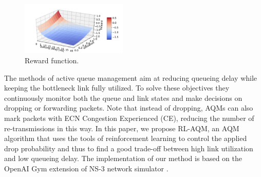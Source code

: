 \documentclass[conference]{IEEEtran}
\begin{document}
\begin{figure}[ht]
\begin{center}
\includegraphics[width=0.45\textwidth]{Figures/reward.pdf}
\end{center}
\caption{Reward function.}
\label{fig:reward}
\end{figure}


The methods of active queue management aim at reducing queueing delay while keeping the bottleneck link fully utilized. To solve these objectives they continuously monitor both the queue and link states and make decisions on dropping or forwarding packets. Note that instead of dropping, AQMs can also mark packets with ECN Congestion Experienced (CE), reducing the number of re-transmissions in this way.
In this paper, we propose RL-AQM, an AQM algorithm that uses the tools of reinforcement learning to control the applied drop probability and thus to find a good trade-off between high link utilization and low queueing delay. The implementation of our method is based on the OpenAI Gym extension of NS-3 network simulator \cite{gawlowicz2019ns}.
\end{document}
